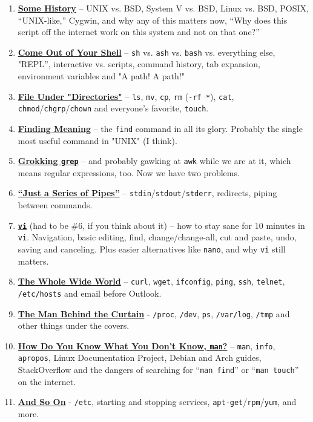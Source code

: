 \documentclass[10pt,]{book}
\numberwithin{figure}{chapter}
\begin{document}
\begin{enumerate}
\def\labelenumi{\arabic{enumi}.}
\setcounter{enumi}{-1}
\item
  \hyperref[some-history]{\textbf{Some History}} – UNIX vs. BSD, System
  V vs. BSD, Linux vs. BSD, POSIX, “UNIX-like,” Cygwin, and why any of
  this matters now, “Why does this script off the internet work on this
  system and not on that one?”
\item
  \hyperref[come-out-of-your-shell]{\textbf{Come Out of Your Shell}} –
  \texttt{sh} vs. \texttt{ash} vs. \texttt{bash} vs. everything else,
  "REPL”, interactive vs. scripts, command history, tab expansion,
  environment variables and "A path! A path!"
\item
  \hyperref[file-under-directories]{\textbf{File Under "Directories"}} –
  \texttt{ls}, \texttt{mv}, \texttt{cp}, \texttt{rm} (\texttt{-rf *}),
  \texttt{cat}, \texttt{chmod}/\texttt{chgrp}/\texttt{chown} and
  everyone's favorite, \texttt{touch}.
\item
  \hyperref[finding-meaning]{\textbf{Finding Meaning}} – the
  \texttt{find} command in all its glory. Probably the single most
  useful command in "UNIX" (I think).
\item
  \hyperref[grokking-grep]{\textbf{Grokking \texttt{grep}}} – and
  probably gawking at \texttt{awk} while we are at it, which means
  regular expressions, too. Now we have two problems.
\item
  \hyperref[just-a-series-of-pipes]{\textbf{“Just a Series of Pipes”}} –
  \texttt{stdin}/\texttt{stdout}/\texttt{stderr}, redirects, piping
  between commands.
\item
  \hyperref[vi]{\textbf{\texttt{vi}}} (had to be \#6, if you think about
  it) – how to stay sane for 10 minutes in \texttt{vi}. Navigation,
  basic editing, find, change/change-all, cut and paste, undo, saving
  and canceling. Plus easier alternatives like \texttt{nano}, and why
  \texttt{vi} still matters.
\item
  \hyperref[the-whole-wide-world]{\textbf{The Whole Wide World}} –
  \texttt{curl}, \texttt{wget}, \texttt{ifconfig}, \texttt{ping},
  \texttt{ssh}, \texttt{telnet}, \texttt{/etc/hosts} and email before
  Outlook.
\item
  \hyperref[the-man-behind-the-curtain]{\textbf{The Man Behind the
  Curtain}} - \texttt{/proc}, \texttt{/dev}, \texttt{ps},
  \texttt{/var/log}, \texttt{/tmp} and other things under the covers.
\item
  \hyperref[how-do-you-know-what-you-dont-know-man]{\textbf{How Do You
  Know What You Don’t Know, \texttt{man}?}} – \texttt{man},
  \texttt{info}, \texttt{apropos}, Linux Documentation Project, Debian
  and Arch guides, StackOverflow and the dangers of searching for
  “\texttt{man find}” or “\texttt{man touch}” on the internet.
\item
  \hyperref[and-so-on]{\textbf{And So On}} - \texttt{/etc}, starting and
  stopping services, \texttt{apt-get}/\texttt{rpm}/\texttt{yum}, and
  more.
\end{enumerate}
\end{document}
